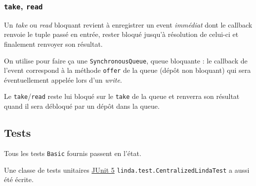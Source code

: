 \documentclass[headings=standardclasses,parskip=half]{scrartcl}
\begin{document}
\subsubsection{\texttt{take}, \texttt{read}}

Un \emph{take} ou \emph{read} bloquant revient à enregistrer un event
\emph{immédiat} dont le callback renvoie le tuple passé en entrée,
rester bloqué jusqu'à résolution de celui-ci et finalement renvoyer
son résultat.

On utilise pour faire ça une \texttt{SynchronousQueue}, queue bloquante :
le callback de l'event correspond à la méthode \texttt{offer} de la queue
(dépôt non bloquant) qui sera éventuellement appelée lors d'un \emph{write}.

Le \texttt{take}/\texttt{read} reste lui bloqué sur le \texttt{take} de la
queue et renverra son résultat quand il sera débloqué par un dépôt dans
la queue.

\subsection{Tests}

Tous les tests \texttt{Basic} fournis passent en l'état.

Une classe de tests unitaires \href{https://junit.org/junit5/}{JUnit 5}
\texttt{linda.test.CentralizedLindaTest} a aussi été écrite.
\end{document}
